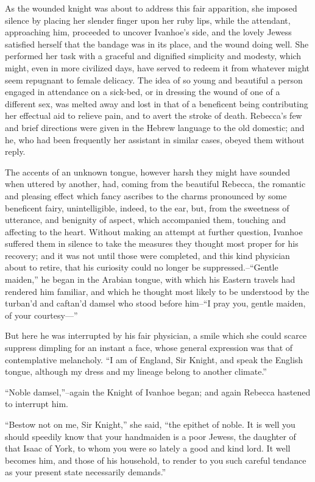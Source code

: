 As the wounded knight was about to address this fair apparition, she
imposed silence by placing her slender finger upon her ruby lips, while
the attendant, approaching him, proceeded to uncover Ivanhoe's side, and
the lovely Jewess satisfied herself that the bandage was in its place,
and the wound doing well. She performed her task with a graceful and
dignified simplicity and modesty, which might, even in more civilized
days, have served to redeem it from whatever might seem repugnant to
female delicacy. The idea of so young and beautiful a person engaged in
attendance on a sick-bed, or in dressing the wound of one of a different
sex, was melted away and lost in that of a beneficent being contributing
her effectual aid to relieve pain, and to avert the stroke of death.
Rebecca's few and brief directions were given in the Hebrew language to
the old domestic; and he, who had been frequently her assistant in
similar cases, obeyed them without reply.

The accents of an unknown tongue, however harsh they might have sounded
when uttered by another, had, coming from the beautiful Rebecca, the
romantic and pleasing effect which fancy ascribes to the charms
pronounced by some beneficent fairy, unintelligible, indeed, to the ear,
but, from the sweetness of utterance, and benignity of aspect, which
accompanied them, touching and affecting to the heart. Without making an
attempt at further question, Ivanhoe suffered them in silence to take
the measures they thought most proper for his recovery; and it was not
until those were completed, and this kind physician about to retire,
that his curiosity could no longer be suppressed.--``Gentle maiden,'' he
began in the Arabian tongue, with which his Eastern travels had rendered
him familiar, and which he thought most likely to be understood by the
turban'd and caftan'd damsel who stood before him--``I pray you, gentle
maiden, of your courtesy---''

But here he was interrupted by his fair physician, a smile which she
could scarce suppress dimpling for an instant a face, whose general
expression was that of contemplative melancholy. ``I am of England, Sir
Knight, and speak the English tongue, although my dress and my lineage
belong to another climate.''

``Noble damsel,''--again the Knight of Ivanhoe began; and again Rebecca
hastened to interrupt him.

``Bestow not on me, Sir Knight,'' she said, ``the epithet of noble. It
is well you should speedily know that your handmaiden is a poor Jewess,
the daughter of that Isaac of York, to whom you were so lately a good
and kind lord. It well becomes him, and those of his household, to
render to you such careful tendance as your present state necessarily
demands.''

